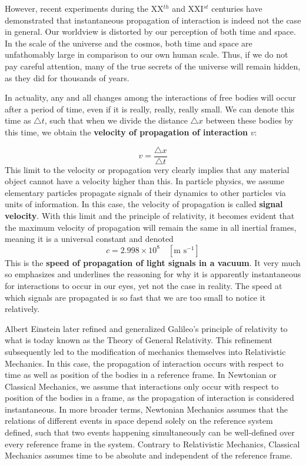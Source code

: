 \documentclass{article}
\begin{document}
			However, recent experiments during the XX$^{th}$ and XXI$^{st}$ centuries have demonstrated that instantaneous propagation of interaction is indeed not the case in general. Our worldview is distorted by our perception of both time and space. In the scale of the universe and the cosmos, both time and space are unfathomably large in comparison to our own human scale. Thus, if we do not pay careful attention, many of the true secrets of the universe will remain hidden, as they did for thousands of years. 
			
			In actuality, any and all changes among the interactions of free bodies will occur after a period of time, even if it is really, really, really small. We can denote this time as $\triangle t$, such that when we divide the distance $\triangle x$ between these bodies by this time, we obtain the \textbf{velocity of propagation of interaction} $v$:
			
			\begin{equation}
				\label{eq:VelocityInteraction}
				\boxed{v = \frac{\triangle x}{\triangle t}}
			\end{equation}
			This limit to the velocity or propagation very clearly implies that any material object cannot have a velocity higher than this. In particle physics, we assume elementary particles propagate signals of their dynamics to other particles via units of information. In this case, the velocity of propagation is called \textbf{signal velocity}. With this limit and the principle of relativity, it becomes evident that the maximum velocity of propagation will remain the same in all inertial frames, meaning it is a universal constant and denoted 
			\begin{equation}
				\label{var:LightSpeed}
				\boxed {c = 2.998 \times 10^8 \quad [\text{m } \text{s}^{-1}]}
			\end{equation}
			This is the \textbf{speed of propagation of light signals in a vacuum}. It very much so emphasizes and underlines the reasoning for why it is apparently instantaneous for interactions to occur in our eyes, yet not the case in reality. The speed at which signals are propagated is so fast that we are too small to notice it relatively. 
			
			Albert Einstein later refined and generalized Galileo's principle of relativity to what is today known as the Theory of General Relativity. This refinement subsequently led to the modification of mechanics themselves into Relativistic Mechanics. In this case, the propagation of interaction occurs with respect to time as well as position of the bodies in a reference frame. In Newtonian or Classical Mechanics, we assume that interactions only occur with respect to position of the bodies in a frame, as the propagation of interaction is considered instantaneous. In more broader terms, Newtonian Mechanics assumes that the relations of different events in space depend solely on the reference system defined, such that two events happening simultaneously can be well-defined over every reference frame in the system. Contrary to Relativistic Mechanics, Classical Mechanics assumes time to be absolute and independent of the reference frame.
			
\end{document}
